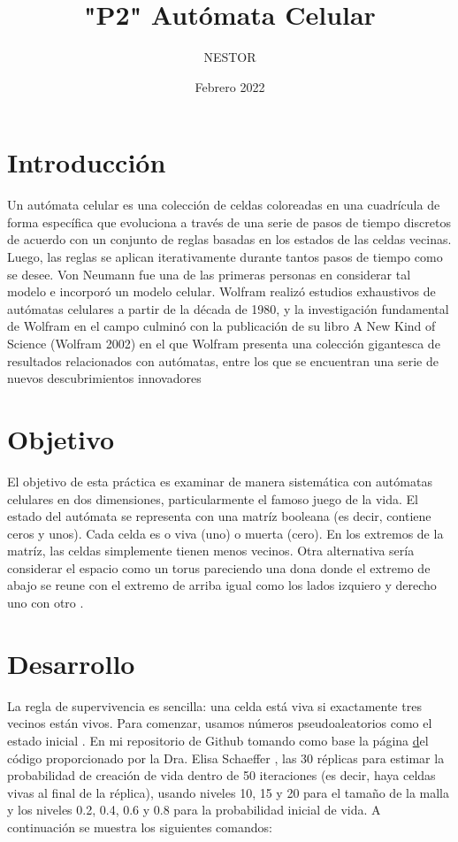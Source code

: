 \documentclass{article}
\title{"P2" Autómata Celular} %
\author{NESTOR}
\date{Febrero 2022}
\begin{document}

\maketitle %
\section{Introducción}


{Un autómata celular es una colección de celdas coloreadas en una cuadrícula de forma específica que evoluciona a través de una serie de pasos de tiempo discretos de acuerdo con un conjunto de reglas basadas en los estados de las celdas vecinas. Luego, las reglas se aplican iterativamente durante tantos pasos de tiempo como se desee. Von Neumann fue una de las primeras personas en considerar tal modelo e incorporó un modelo celular. Wolfram realizó estudios exhaustivos de autómatas celulares a partir de la década de 1980, y la investigación fundamental de Wolfram en el campo culminó con la publicación de su libro A New Kind of Science (Wolfram 2002) en el que Wolfram presenta una colección gigantesca de resultados relacionados con autómatas, entre los que se encuentran una serie de nuevos descubrimientos innovadores \cite{steve2}


\section{Objetivo}
El objetivo de esta práctica es examinar de manera sistemática con autómatas celulares en dos dimensiones, particularmente el famoso juego de la vida. El estado del autómata se representa con una matríz booleana (es decir, contiene ceros y unos). Cada celda es o viva (uno) o muerta (cero). En los extremos de la matríz, las celdas simplemente tienen menos vecinos. Otra alternativa sería considerar el espacio como un torus pareciendo una dona donde el extremo de abajo se reune con el extremo de arriba igual como los lados izquiero y derecho uno con otro \cite{elisa1}.

\section{Desarrollo} %

La regla de supervivencia es sencilla: una celda está viva si exactamente tres vecinos están vivos. Para comenzar, usamos números pseudoaleatorios como el estado inicial \cite{elisa1}.
En mi repositorio de Github tomando como base la página \href{https://github.com/satuelisa/Simulation/blob/master/CellularAutomata/gameOfLife.py} del {c\'odigo} proporcionado por la Dra. Elisa Schaeffer \cite{elisa1}, las 30 réplicas para estimar la probabilidad de creación de vida dentro de 50 iteraciones (es decir, haya celdas vivas al final de la réplica), usando niveles 10, 15 y 20 para el tamaño de la malla y los niveles 0.2, 0.4, 0.6 y 0.8 para la probabilidad inicial de vida. A continuación se muestra los siguientes comandos:

}
\end{document}
